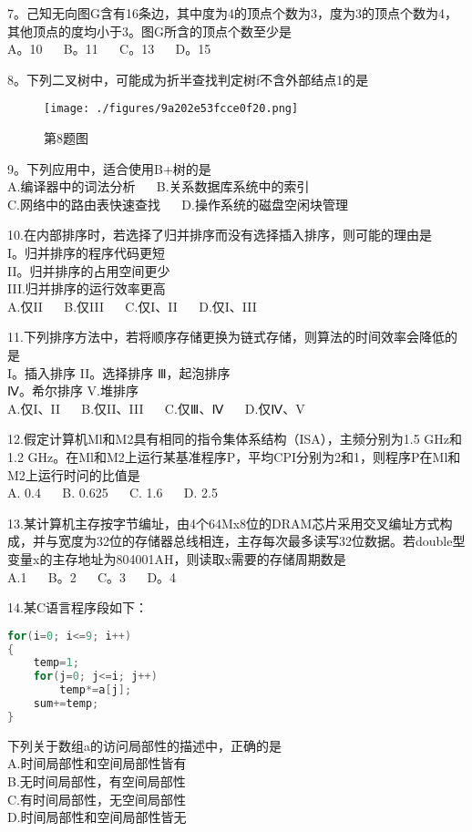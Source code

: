 7。己知无向图G含有16条边，其中度为4的顶点个数为3，度为3的顶点个数为4，其他顶点的度均小于3。图G所含的顶点个数至少是 \\
A。10  $\quad$  B。11  $\quad$  C。13  $\quad$  D。15

8。下列二叉树中，可能成为折半查找判定树f不含外部结点1的是 \\
\begin{figure}[ht]
\centering
\texttt{[image: ./figures/9a202e53fcce0f20.png]}
\caption{第8题图} \label{fig_CSN17_2}
\end{figure}

9。下列应用中，适合使用B+树的是 \\
A.编译器中的词法分析 $\quad$ B.关系数据库系统中的索引 \\
C.网络中的路由表快速查找  $\quad$  D.操作系统的磁盘空闲块管理

10.在内部排序时，若选择了归并排序而没有选择插入排序，则可能的理由是 \\
I。归并排序的程序代码更短 \\
II。归并排序的占用空间更少 \\
III.归并排序的运行效率更高 \\
A.仅II  $\quad$  B.仅III  $\quad$  C.仅I、II  $\quad$  D.仅I、III

11.下列排序方法中，若将顺序存储更换为链式存储，则算法的时间效率会降低的是 \\
I。插入排序    II。选择排序  Ⅲ，起泡排序 \\
Ⅳ。希尔排序    V.堆排序 \\
A.仅I、II $\quad$ B.仅II、III  $\quad$  C.仅Ⅲ、Ⅳ  $\quad$  D.仅Ⅳ、V

12.假定计算机Ml和M2具有相同的指令集体系结构（ISA），主频分别为1.5 GHz和1.2 GHz。在Ml和M2上运行某基准程序P，平均CPI分别为2和1，则程序P在Ml和M2上运行时问的比值是 \\
A. 0.4  $\quad$  B. 0.625  $\quad$  C. 1.6  $\quad$  D. 2.5

13.某计算机主存按字节编址，由4个64Mx8位的DRAM芯片采用交叉编址方式构成，并与宽度为32位的存储器总线相连，主存每次最多读写32位数据。若double型变量x的主存地址为804001AH，则读取x需要的存储周期数是 \\
A.1  $\quad$  B。2  $\quad$  C。3  $\quad$  D。4

14.某C语言程序段如下： \\
\begin{lstlisting}[language=cpp]
for(i=0; i<=9; i++)
{
    temp=1;
    for(j=0; j<=i; j++)
        temp*=a[j];
    sum+=temp;
}
\end{lstlisting}
下列关于数组a的访问局部性的描述中，正确的是 \\
A.时间局部性和空间局部性皆有 \\
B.无时间局部性，有空间局部性 \\
C.有时间局部性，无空间局部性 \\
D.时间局部性和空间局部性皆无

